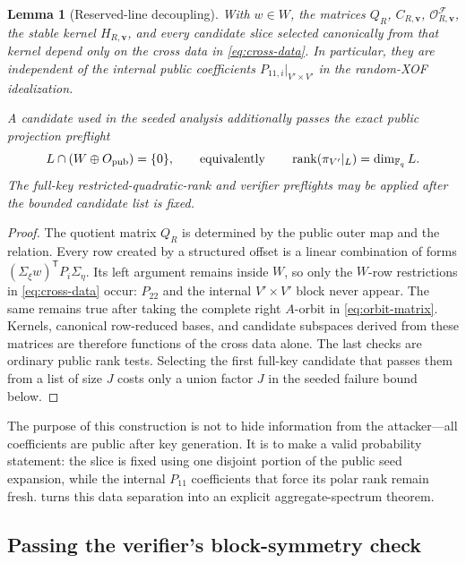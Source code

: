 \documentclass[11pt]{article}
\newtheorem{lemma}[lemma]{Lemma}
\newcommand{\F}{\mathbb F}
\newcommand{\rank}{\operatorname{rank}}
\newcommand{\transpose}{\mathsf T}
\begin{document}
\begin{lemma}[Reserved-line decoupling]\label{lem:reserved-line-decoupling}
With $w\in W$, the matrices $Q_R$, $C_{R,\mathbf v}$,
$\mathcal O^{\mathcal F}_{R,\mathbf v}$, the stable kernel $H_{R,\mathbf v}$, and every
candidate slice selected canonically from that kernel depend only on the cross
data in \eqref{eq:cross-data}.  In particular, they are independent of the
internal public coefficients $P_{11,i}|_{V'\times V'}$ in the random-XOF
idealization.

A candidate used in the seeded analysis additionally passes the exact public
projection preflight
\begin{equation}\label{eq:projection-preflight}
 L\cap(W\oplus O_{\rm pub})=\{0\},
 \qquad\text{equivalently}\qquad
 \rank(\pi_{V'}|_L)=\dim_{\F_q}L.
\end{equation}
The full-key restricted-quadratic-rank and verifier preflights may be applied
after the bounded candidate list is fixed.
\end{lemma}

\begin{proof}
The quotient matrix $Q_R$ is determined by the public outer map and the
relation.  Every row created by a structured offset is a linear combination of
forms $(\Sigma_\xi w)^\transpose P_i\Sigma_\eta$.  Its left argument remains
inside $W$, so only the $W$-row restrictions in \eqref{eq:cross-data} occur:
$P_{22}$ and the internal $V'\times V'$ block never appear.  The same remains
true after taking the complete right $A$-orbit in
\eqref{eq:orbit-matrix}.  Kernels, canonical row-reduced bases, and candidate
subspaces derived from these matrices are therefore functions of the cross
data alone.  The last checks are ordinary public rank tests.  Selecting the
first full-key candidate that passes them from a list of size $J$ costs only a
union factor $J$ in the seeded failure bound below.
\end{proof}

The purpose of this construction is not to hide information from the
attacker---all coefficients are public after key generation.  It is to make a
valid probability statement: the slice is fixed using one disjoint portion of
the public seed expansion, while the internal $P_{11}$ coefficients that force
its polar rank remain fresh.   turns this data
separation into an explicit aggregate-spectrum theorem.

\subsection{Passing the verifier's block-symmetry check}\label{sec:rejection}
\end{document}
